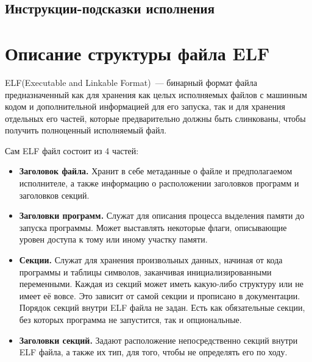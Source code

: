 \documentclass[14pt, russian, onesize]{extreport}
\begin{document}
\subsection*{Инструкции-подсказки исполнения}

\section*{Описание структуры файла ELF}
ELF(Executable and Linkable Format)~--- бинарный формат файла предназначенный
как для хранения как целых исполняемых файлов с машинным кодом и дополнительной
информацией для его запуска, так и для хранения отдельных его частей, которые
предварительно должны быть слинкованы, чтобы получить полноценный исполняемый
файл. 

Сам ELF файл состоит из 4 частей:
\begin{itemize}
    \item \textbf{Заголовок файла.}
        Хранит в себе метаданные о файле и предполагаемом исполнителе,
        а также информацию о расположении заголовков программ и заголовков секций.
    \item \textbf{Заголовки программ.}
        Служат для описания процесса выделения памяти до запуска программы. 
        Может выставлять некоторые флаги, описывающие уровен доступа
        к тому или иному участку памяти.
    \item \textbf{Секции.}
        Служат для хранения произвольных данных, начиная от кода программы
        и таблицы символов, заканчивая инициализированными переменными.
        Каждая из секций может иметь какую-либо структуру или не имеет
        её вовсе. Это зависит от самой секции и прописано в документации.
        Порядок секций внутри ELF файла не задан. Есть как обязательные
        секции, без которых программа не запустится, так и опциональные.
    \item \textbf{Заголовки секций.}
        Задают расположение непосредственно секций внутри ELF файла,
        а также их тип, для того, чтобы не определять его по ходу.
\end{itemize}
\end{document}
